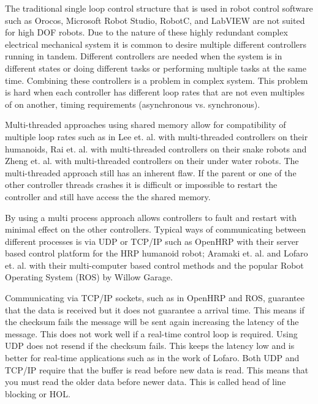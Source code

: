 The traditional single loop control structure that is used in robot control software such as Orocos\cite{orocos-gadeyne-ijrr2005}, Microsoft Robot Studio\cite{microsoftRobot4437755}, RobotC\cite{robotc}, and LabVIEW\cite{labview} are not suited for high DOF robots.
Due to the nature of these highly redundant complex electrical mechanical system it is common to desire multiple different controllers running in tandem.  
Different controllers are needed when the system is in different states or doing different tasks or performing multiple tasks at the same time.
Combining these controllers is a problem in complex system.
This problem is hard when each controller has different loop rates that are not even multiples of on another, timing requirements (asynchronous vs. synchronous).

Multi-threaded approaches using shared memory allow for compatibility of multiple loop rates such as in Lee et. al.\cite{multi-thread-robot-5602743} with multi-threaded controllers on their humanoids, Rai et. al.\cite{multi-thread-snake-1541141} with multi-threaded controllers on their snake robots and Zheng et. al.\cite{multi-thread-5524083} with multi-threaded controllers on their under water robots.
The multi-threaded approach still has an inherent flaw.
If the parent or one of the other controller threads crashes it is difficult or impossible to restart the controller and still have access the the shared memory.

By using a multi process approach allows controllers to fault and restart with minimal effect on the other controllers.
Typical ways of communicating between different processes is via UDP or TCP/IP such as OpenHRP\cite{openHRP} with their server based control platform for the HRP humanoid robot; Aramaki et. al.\cite{multiPC-arch-1185243} and Lofaro et. al.\cite{lofaroIASTED2011} with their multi-computer based control methods and the popular Robot Operating System (ROS)\cite{ros} by Willow Garage.

Communicating via TCP/IP sockets, such as in OpenHRP and ROS, guarantee that the data is received but it does not guarantee a arrival time.
This means if the checksum fails the message will be sent again increasing the latency of the message.
This does not work well if a real-time control loop is required.
Using UDP does not resend if the checksum fails.
This keeps the latency low and is better for real-time applications such as in the work of Lofaro.
Both UDP and TCP/IP require that the buffer is read before new data is read.
This means that you must read the older data before newer data.
This is called head of line blocking or HOL\cite{ach}.

